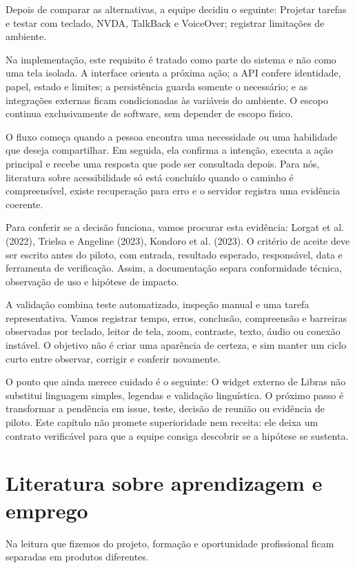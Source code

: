 \documentclass[12pt,oneside,a4paper,article]{abntex2}
\begin{document}
Depois de comparar as alternativas, a equipe decidiu o seguinte: Projetar tarefas e testar com teclado, NVDA, TalkBack e VoiceOver; registrar limitações de ambiente.

Na implementação, este requisito é tratado como parte do sistema e não como uma tela isolada. A interface orienta a próxima ação; a API confere identidade, papel, estado e limites; a persistência guarda somente o necessário; e as integrações externas ficam condicionadas às variáveis do ambiente. O escopo continua exclusivamente de software, sem depender de escopo físico.

O fluxo começa quando a pessoa encontra uma necessidade ou uma habilidade que deseja compartilhar. Em seguida, ela confirma a intenção, executa a ação principal e recebe uma resposta que pode ser consultada depois. Para nós, literatura sobre acessibilidade só está concluído quando o caminho é compreensível, existe recuperação para erro e o servidor registra uma evidência coerente.

Para conferir se a decisão funciona, vamos procurar esta evidência: Lorgat et al. (2022), Trielsa e Angeline (2023), Kondoro et al. (2023). O critério de aceite deve ser escrito antes do piloto, com entrada, resultado esperado, responsável, data e ferramenta de verificação. Assim, a documentação separa conformidade técnica, observação de uso e hipótese de impacto.

A validação combina teste automatizado, inspeção manual e uma tarefa representativa. Vamos registrar tempo, erros, conclusão, compreensão e barreiras observadas por teclado, leitor de tela, zoom, contraste, texto, áudio ou conexão instável. O objetivo não é criar uma aparência de certeza, e sim manter um ciclo curto entre observar, corrigir e conferir novamente.

O ponto que ainda merece cuidado é o seguinte: O widget externo de Libras não substitui linguagem simples, legendas e validação linguística. O próximo passo é transformar a pendência em issue, teste, decisão de reunião ou evidência de piloto. Este capítulo não promete superioridade nem receita: ele deixa um contrato verificável para que a equipe consiga descobrir se a hipótese se sustenta.

\section{Literatura sobre aprendizagem e emprego}
Na leitura que fizemos do projeto, formação e oportunidade profissional ficam separadas em produtos diferentes.
\end{document}

